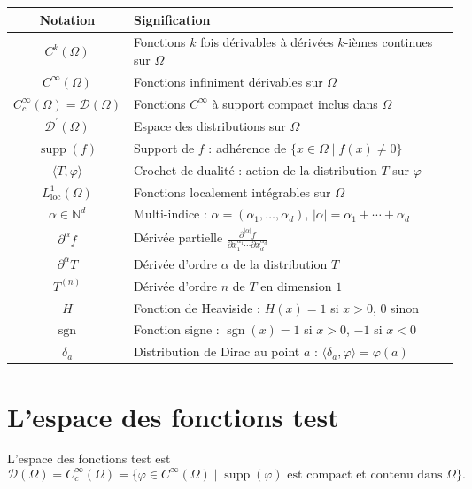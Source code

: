 \documentclass[12pt,a4paper,openany]{book}
\theoremstyle{definition}
\theoremstyle{plain}
\theoremstyle{remark}
\begin{document}
	\medskip
	\begin{center}
		\renewcommand{\arraystretch}{1.4}
		\begin{tabular}{@{}cl@{}}
			\toprule
			\textbf{Notation} & \textbf{Signification} \\
			\midrule
			$C^{k}(\Omega)$ & Fonctions $k$ fois dérivables à dérivées $k$-ièmes continues sur $\Omega$ \\
			$C^{\infty}(\Omega)$ & Fonctions infiniment dérivables sur $\Omega$ \\
			$C_{c}^{\infty}(\Omega)=\mathcal{D}(\Omega)$ & Fonctions $C^{\infty}$ à support compact inclus dans $\Omega$ \\
			$\mathcal{D}^{\prime}(\Omega)$ & Espace des distributions sur $\Omega$ \\
			$\operatorname{supp}(f)$ & Support de $f$ : adhérence de $\{x \in \Omega \mid f(x) \neq 0\}$ \\
			$\langle T, \varphi\rangle$ & Crochet de dualité : action de la distribution $T$ sur $\varphi$ \\
			$L_{\text{loc}}^{1}(\Omega)$ & Fonctions localement intégrables sur $\Omega$ \\
			$\alpha \in \mathbb{N}^{d}$ & Multi-indice : $\alpha = (\alpha_1, \dots, \alpha_d)$, $|\alpha| = \alpha_1 + \cdots + \alpha_d$ \\
			$\partial^{\alpha}f$ & Dérivée partielle $\frac{\partial^{|\alpha|}f}{\partial x_1^{\alpha_1} \cdots \partial x_d^{\alpha_d}}$ \\
			$\partial^{\alpha}T$ & Dérivée d'ordre $\alpha$ de la distribution $T$ \\
			$T^{(n)}$ & Dérivée d'ordre $n$ de $T$ en dimension $1$ \\
			$H$ & Fonction de Heaviside : $H(x) = 1$ si $x > 0$, $0$ sinon \\
			$\operatorname{sgn}$ & Fonction signe : $\operatorname{sgn}(x) = 1$ si $x > 0$, $-1$ si $x < 0$ \\
			$\delta_{a}$ & Distribution de Dirac au point $a$ : $\langle \delta_{a}, \varphi \rangle = \varphi(a)$ \\
			\bottomrule
		\end{tabular}
	\end{center}
	\medskip
	
	\section{L'espace des fonctions test}
	
	\begin{definition}
		L'espace des fonctions test est
		\[
		\mathcal{D}(\Omega) = C_c^{\infty}(\Omega) = \{ \varphi \in C^{\infty}(\Omega) \mid \operatorname{supp}(\varphi) \text{ est compact et contenu dans } \Omega \}.
		\]
	\end{definition}
	
\end{document}
